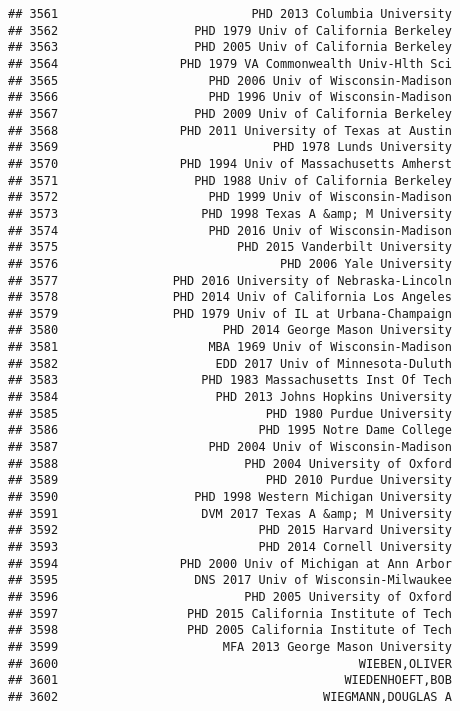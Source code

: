 \documentclass[
]{article}
\begin{document}
\begin{verbatim}
## 3561                           PHD 2013 Columbia University
## 3562                   PHD 1979 Univ of California Berkeley
## 3563                   PHD 2005 Univ of California Berkeley
## 3564                 PHD 1979 VA Commonwealth Univ-Hlth Sci
## 3565                     PHD 2006 Univ of Wisconsin-Madison
## 3566                     PHD 1996 Univ of Wisconsin-Madison
## 3567                   PHD 2009 Univ of California Berkeley
## 3568                 PHD 2011 University of Texas at Austin
## 3569                              PHD 1978 Lunds University
## 3570                 PHD 1994 Univ of Massachusetts Amherst
## 3571                   PHD 1988 Univ of California Berkeley
## 3572                     PHD 1999 Univ of Wisconsin-Madison
## 3573                    PHD 1998 Texas A &amp; M University
## 3574                     PHD 2016 Univ of Wisconsin-Madison
## 3575                         PHD 2015 Vanderbilt University
## 3576                               PHD 2006 Yale University
## 3577                PHD 2016 University of Nebraska-Lincoln
## 3578                PHD 2014 Univ of California Los Angeles
## 3579                PHD 1979 Univ of IL at Urbana-Champaign
## 3580                       PHD 2014 George Mason University
## 3581                     MBA 1969 Univ of Wisconsin-Madison
## 3582                      EDD 2017 Univ of Minnesota-Duluth
## 3583                    PHD 1983 Massachusetts Inst Of Tech
## 3584                      PHD 2013 Johns Hopkins University
## 3585                             PHD 1980 Purdue University
## 3586                            PHD 1995 Notre Dame College
## 3587                     PHD 2004 Univ of Wisconsin-Madison
## 3588                          PHD 2004 University of Oxford
## 3589                             PHD 2010 Purdue University
## 3590                   PHD 1998 Western Michigan University
## 3591                    DVM 2017 Texas A &amp; M University
## 3592                            PHD 2015 Harvard University
## 3593                            PHD 2014 Cornell University
## 3594                 PHD 2000 Univ of Michigan at Ann Arbor
## 3595                   DNS 2017 Univ of Wisconsin-Milwaukee
## 3596                          PHD 2005 University of Oxford
## 3597                  PHD 2015 California Institute of Tech
## 3598                  PHD 2005 California Institute of Tech
## 3599                       MFA 2013 George Mason University
## 3600                                          WIEBEN,OLIVER
## 3601                                        WIEDENHOEFT,BOB
## 3602                                     WIEGMANN,DOUGLAS A

\end{verbatim}
\end{document}
